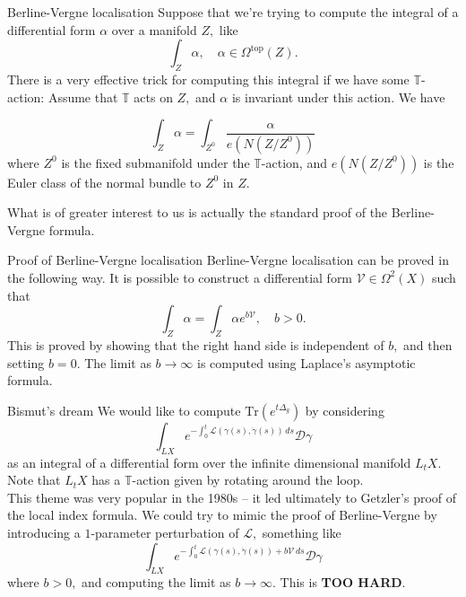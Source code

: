 \documentclass{beamer}
\numberwithin{equation}{section}
\theoremstyle{plain}
\theoremstyle{plain}
\theoremstyle{definition}
\theoremstyle{plain}
\theoremstyle{plain}
\theoremstyle{definition}
\newcommand{\Circ}{\mathbb{T}}
\newcommand{\Dc}{\mathcal{D}}
\newcommand{\Lc}{\mathcal{L}}
\newcommand{\Vc}{\mathcal{V}}
\newcommand{\Tr}{\mathrm{Tr}}
\begin{document}
\begin{frame}{Berline-Vergne localisation}
  Suppose that we're trying to compute the integral of a differential form $\alpha$ over a manifold $Z,$ like
  \[
    \int_Z \alpha,\quad \alpha\in \Omega^{\mathrm{top}}(Z).
  \]
  There is a very effective trick for computing this integral if we have some $\Circ$-action: Assume that $\Circ$ acts
  on $Z,$ and $\alpha$ is invariant under this action. We have
  \begin{theorem}
    \[
      \int_Z \alpha = \int_{Z^{0}} \frac{\alpha}{e(N(Z/Z^0))}
    \]
    where $Z^0$ is the fixed submanifold under the $\Circ$-action, and $e(N(Z/Z^0))$ is the Euler class of the normal bundle to $Z^0$ in $Z.$    
  \end{theorem}
  What is of greater interest to us is actually the standard proof of the Berline-Vergne formula.
\end{frame}

\begin{frame}{Proof of Berline-Vergne localisation}
    Berline-Vergne localisation can be proved in the following way. It is possible to construct a differential form $\Vc \in \Omega^2(X)$ such that
    \[
      \int_Z \alpha = \int_Z \alpha e^{b\Vc},\quad b>0.
    \]
    This is proved by showing that the right hand side is independent of $b,$ and then setting $b=0.$ The limit as $b\to\infty$ is computed using Laplace's asymptotic formula.
\end{frame}

\begin{frame}{Bismut's dream}
  We would like to compute $\Tr(e^{t\Delta_g})$ by considering
  \[
    \int_{LX} e^{-\int_0^t \Lc(\gamma(s),\dot{\gamma}(s))\,ds} \Dc\gamma
  \]
  as an integral of a differential form over the infinite dimensional manifold $L_tX.$
  Note that $L_tX$ has a $\Circ$-action given by rotating around the loop.
  \\
  \pause
  This theme was very popular in the 1980s -- it led ultimately to Getzler's proof of the local index formula.  
  \pause
  We could try to mimic the proof of Berline-Vergne by introducing a $1$-parameter perturbation of $\Lc,$ something like
  \[
      \int_{LX} e^{-\int_0^t \Lc(\gamma(s),\dot{\gamma}(s))+b\Vc\,ds} \Dc\gamma
  \]
  where $b>0,$ and computing the limit as $b\to\infty.$
  \pause
  This is \textbf{TOO HARD}.
\end{frame}
\end{document}
